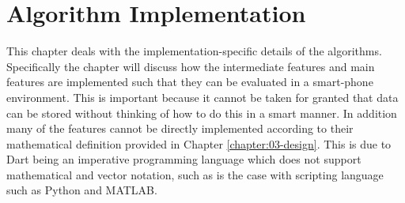 \chapter{Algorithm Implementation}
This chapter deals with the implementation-specific details of the algorithms. Specifically the chapter will discuss how the intermediate features and main features are implemented such that they can be evaluated in a smart-phone environment. This is important because it cannot be taken for granted that data can be stored without thinking of how to do this in a smart manner. In addition many of the features cannot be directly implemented according to their mathematical definition provided in Chapter \ref{chapter:03-design}. This is due to Dart being an imperative programming language which does not support mathematical and vector notation, such as is the case with scripting language such as Python and MATLAB. 






